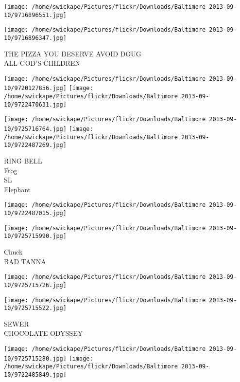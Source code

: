 \documentclass[10pt,letterpaper]{article}
\begin{document}
\texttt{[image: /home/swickape/Pictures/flickr/Downloads/Baltimore 2013-09-10/9716896551.jpg]}

\vspace{0.25in}
\texttt{[image: /home/swickape/Pictures/flickr/Downloads/Baltimore 2013-09-10/9716896347.jpg]}

THE PIZZA YOU DESERVE AVOID DOUG\\
ALL GOD'S CHILDREN\\
\pagebreak

\texttt{[image: /home/swickape/Pictures/flickr/Downloads/Baltimore 2013-09-10/9720127856.jpg]}
\texttt{[image: /home/swickape/Pictures/flickr/Downloads/Baltimore 2013-09-10/9722470631.jpg]}

\texttt{[image: /home/swickape/Pictures/flickr/Downloads/Baltimore 2013-09-10/9725716764.jpg]}
\texttt{[image: /home/swickape/Pictures/flickr/Downloads/Baltimore 2013-09-10/9722487269.jpg]}

RING BELL\\
Frog\\
SL\\
Elephant\\
\pagebreak

\texttt{[image: /home/swickape/Pictures/flickr/Downloads/Baltimore 2013-09-10/9722487015.jpg]}

\vspace{0.25in}
\texttt{[image: /home/swickape/Pictures/flickr/Downloads/Baltimore 2013-09-10/9725715990.jpg]}

Chuck\\
BAD TANNA\\
\pagebreak

\texttt{[image: /home/swickape/Pictures/flickr/Downloads/Baltimore 2013-09-10/9725715726.jpg]}

\vspace{0.25in}
\texttt{[image: /home/swickape/Pictures/flickr/Downloads/Baltimore 2013-09-10/9725715522.jpg]}

SEWER\\
CHOCOLATE ODYSSEY\\
\pagebreak

\texttt{[image: /home/swickape/Pictures/flickr/Downloads/Baltimore 2013-09-10/9725715280.jpg]}
\texttt{[image: /home/swickape/Pictures/flickr/Downloads/Baltimore 2013-09-10/9722485849.jpg]}
\end{document}
